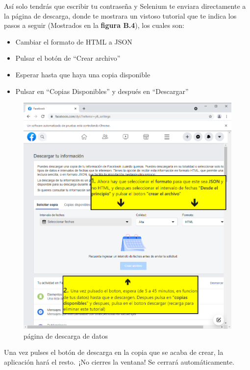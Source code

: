 Así solo tendrás que escribir tu contraseña y Selenium te enviara directamente a la página de descarga, donde te mostrara un vistoso tutorial que te indica los pasos a seguir (Mostrados en la \textbf{figura B.4}), los cuales son:

\begin{itemize}
	\item Cambiar el formato de HTML a JSON
	\item Pulsar el botón de ``Crear archivo''
	\item Esperar hasta que haya una copia disponible
	\item Pulsar en ``Copias Disponibles'' y después en ``Descargar''
\end{itemize}
\begin{figure}
	\begin{center}
		\includegraphics[scale=0.5]{Imagenes/Fuentes/TutorialDescarga2.png} \caption{página de descarga de datos}
		\label{TutorialDescarga2}
	\end{center}
\end{figure}

Una vez pulses el botón de descarga en la copia que se acaba de crear, la aplicación hará el resto. ¡No cierres la ventana! Se cerrará automáticamente.

